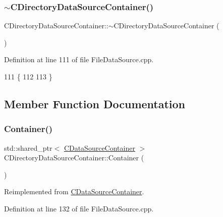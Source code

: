 \subsubsection{\texorpdfstring{$\sim$\+C\+Directory\+Data\+Source\+Container()}{~CDirectoryDataSourceContainer()}}
{\footnotesize\ttfamily C\+Directory\+Data\+Source\+Container\+::$\sim$\+C\+Directory\+Data\+Source\+Container (\begin{DoxyParamCaption}{ }\end{DoxyParamCaption})}



Definition at line 111 of file File\+Data\+Source.\+cpp.


\begin{DoxyCode}
111                                                              \{
112     
113 \}
\end{DoxyCode}


\subsection{Member Function Documentation}
\hypertarget{classCDirectoryDataSourceContainer_a5a498db9b312c223b0816fc6cc1fcd3d}{}\label{classCDirectoryDataSourceContainer_a5a498db9b312c223b0816fc6cc1fcd3d} 
\subsubsection{\texorpdfstring{Container()}{Container()}}
{\footnotesize\ttfamily std\+::shared\+\_\+ptr$<$ \hyperlink{classCDataSourceContainer}{C\+Data\+Source\+Container} $>$ C\+Directory\+Data\+Source\+Container\+::\+Container (\begin{DoxyParamCaption}{ }\end{DoxyParamCaption})\hspace{0.3cm}{\ttfamily [virtual]}}



Reimplemented from \hyperlink{classCDataSourceContainer_a040c80f46e9d2df36b494290a945e61a}{C\+Data\+Source\+Container}.



Definition at line 132 of file File\+Data\+Source.\+cpp.


